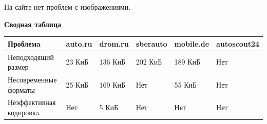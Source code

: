 \noindent
\begin{minipage}{\linewidth}
\end{minipage}
\bigskip

\noindent
\begin{minipage}{\linewidth}
\end{minipage}
\bigskip

На сайте нет проблем с изображениями.
\bigskip

\textbf{Сводная таблица}

\begin{table}[H]
    \small
\begin{tabular}{|l|l|l|l|l|l|}
\hline
    \textbf{Проблемa} & \textbf{auto.ru} & \textbf{drom.ru} & \textbf{sberauto} & \textbf{mobile.de} & \textbf{autoscout24} \\
\hline
    Неподходящий размер & 23 КиБ & 136 КиБ & 202 КиБ & 189 КиБ & Нет \\
\hline
    Несовременные форматы & 25 КиБ & 169 КиБ & Нет & 55 КиБ & Нет\\
\hline
    Неэффективная кодировкa & Нет & 5 КиБ & Нет & Нет & Нет\\
\hline
\end{tabular}
\end{table}

